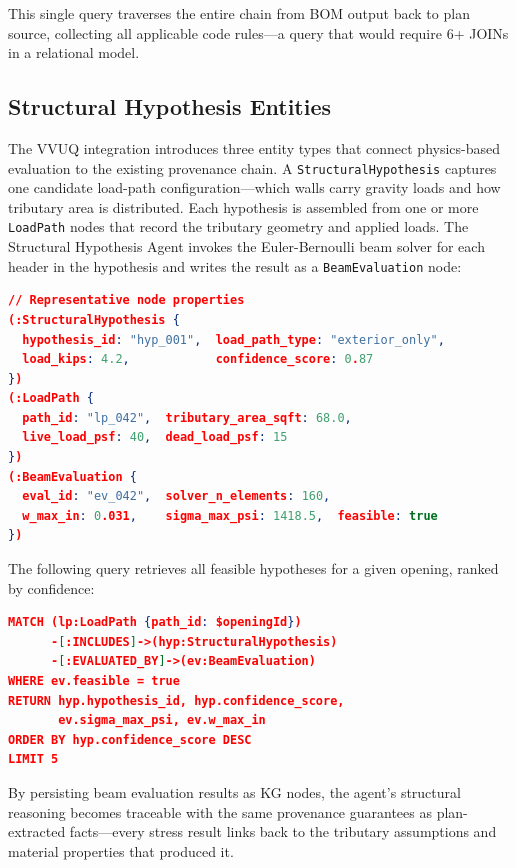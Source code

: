 This single query traverses the entire chain from BOM output back to plan source, collecting all applicable code rules---a query that would require 6+ JOINs in a relational model.

\subsection{Structural Hypothesis Entities}

The VVUQ integration introduces three entity types that connect physics-based evaluation to the existing provenance chain.
A \texttt{StructuralHypothesis} captures one candidate load-path configuration---which walls carry gravity loads and how tributary area is distributed.
Each hypothesis is assembled from one or more \texttt{LoadPath} nodes that record the tributary geometry and applied loads.
The Structural Hypothesis Agent invokes the Euler-Bernoulli beam solver for each header in the hypothesis and writes the result as a \texttt{BeamEvaluation} node:

\begin{lstlisting}[language=json, basicstyle=\ttfamily\scriptsize]
// Representative node properties
(:StructuralHypothesis {
  hypothesis_id: "hyp_001",  load_path_type: "exterior_only",
  load_kips: 4.2,            confidence_score: 0.87
})
(:LoadPath {
  path_id: "lp_042",  tributary_area_sqft: 68.0,
  live_load_psf: 40,  dead_load_psf: 15
})
(:BeamEvaluation {
  eval_id: "ev_042",  solver_n_elements: 160,
  w_max_in: 0.031,    sigma_max_psi: 1418.5,  feasible: true
})
\end{lstlisting}

The following query retrieves all feasible hypotheses for a given opening, ranked by confidence:

\begin{lstlisting}[language=json, basicstyle=\ttfamily\scriptsize]
MATCH (lp:LoadPath {path_id: $openingId})
      -[:INCLUDES]->(hyp:StructuralHypothesis)
      -[:EVALUATED_BY]->(ev:BeamEvaluation)
WHERE ev.feasible = true
RETURN hyp.hypothesis_id, hyp.confidence_score,
       ev.sigma_max_psi, ev.w_max_in
ORDER BY hyp.confidence_score DESC
LIMIT 5
\end{lstlisting}

By persisting beam evaluation results as KG nodes, the agent's structural reasoning becomes traceable with the same provenance guarantees as plan-extracted facts---every stress result links back to the tributary assumptions and material properties that produced it.

